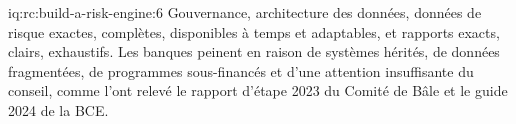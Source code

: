 \begin{solution}{iq:rc:build-a-risk-engine:6}
Gouvernance, architecture des données, données de risque exactes, complètes, disponibles à temps et adaptables, et rapports exacts, clairs,
exhaustifs. Les banques peinent en raison de systèmes hérités, de données fragmentées, de programmes sous-financés
et d'une attention insuffisante du conseil, comme l'ont relevé le rapport d'étape 2023 du Comité de Bâle et le guide 2024 de la BCE.
\end{solution}
